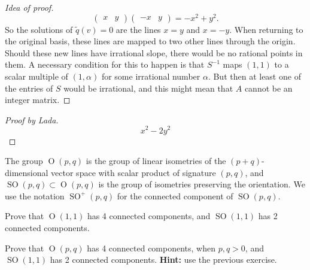 \documentclass{article}
\numberwithin{equation}{section}
\renewcommand{\O}{\operatorname{O}}
\DeclareMathOperator{\SO}{SO}
\begin{document}
\begin{proof}[Idea of proof]
\[		\begin{pmatrix}
			x&y
		\end{pmatrix}
		\begin{pmatrix}
			-x&y
		\end{pmatrix}=-x^2+y^2.\]
		So the solutions of $\tilde q(v)=0$ are the lines $x=y$ and $x=-y$. When returning to the original basis, these lines are mapped to two other lines through the origin. Should these new lines have irrational slope, there would be no rational points in them. A necessary condition for this to happen is that $S^{-1}$ maps $(1,1)$ to a scalar multiple of $(1,\alpha)$ for some irrational number $\alpha$. But then at least one of the entries of $S$ would be irrational, and this {\color{magenta}might mean} that $A$ cannot be an integer matrix.
	\end{proof}
	\begin{proof}[Proof by Lada]
		\[x^2-2y^2\]
	\end{proof}
	\begin{defn}
		The group $\O(p,q)$ is the group of linear isometries of the $(p+q)$-dimensional vector space with scalar product of signature $(p,q)$, and $\SO(p,q)\subset\O(p,q)$ is the group of isometries preserving the orientation. We use the notation $\SO^+(p,q)$ for the connected component of $\SO(p,q)$.
	\end{defn}
	\begin{exercise}\label{ex:2.2}
		Prove that $\O(1,1)$ has 4 connected components, and $\SO(1,1)$ has 2 connected components.
	\end{exercise}
	\begin{exercise}\label{ex:2.3}
		Prove that $\O(p,q)$ has 4 connected components, when $p,q>0$, and $\SO(1,1)$ has 2 connected components. \textbf{Hint:} use the previous exercise.
	\end{exercise}
\end{document}
